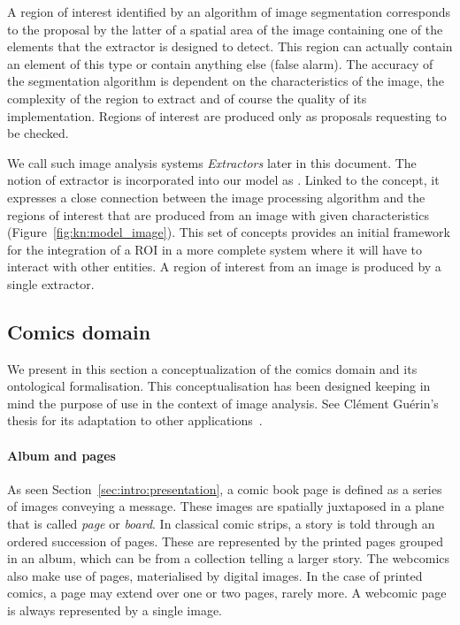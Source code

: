 A region of interest identified by an algorithm of image segmentation corresponds to the proposal by the latter of a spatial area of the image containing one of the elements that the extractor is designed to detect.
This region can actually contain an element of this type or contain anything else (false alarm).
The accuracy of the segmentation algorithm is dependent on the characteristics of the image, the complexity of the region to extract and of course the quality of its implementation.
Regions of interest are produced only as proposals requesting to be checked.

We call such image analysis systems \textit{Extractors} later in this document.
The notion of extractor is incorporated into our model as .
Linked to the  concept, it expresses a close connection between the image processing algorithm and the regions of interest that are produced from an image with given characteristics (Figure~\ref{fig:kn:model_image}).
This set of concepts provides an initial framework for the integration of a ROI in a more complete system where it will have to interact with other entities.
A region of interest from an image is produced by a single extractor.


\subsection{Comics domain} %
\label{sub:kn:comics_domain}

We present in this section a conceptualization of the comics domain and its ontological formalisation.
This conceptualisation has been designed keeping in mind the purpose of use in the context of image analysis.
See Cl{\'e}ment Gu{\'e}rin's thesis for its adaptation to other applications~\cite{phdthesisGuerin14}.

\paragraph{Album and pages} %
\label{par:album_and_pages}

As seen Section~\ref{sec:intro:presentation}, a comic book page is defined as a series of images conveying a message.
These images are spatially juxtaposed in a plane that is called \emph{page} or \emph{board}.
In classical comic strips, a story is told through an ordered succession of pages.
These are represented by the printed pages grouped in an album, which can be from a  collection telling a larger story.
The webcomics also make use of pages, materialised by digital images.
In the case of printed comics, a page may extend over one or two pages, rarely more.
A webcomic page is always represented by a single image.

